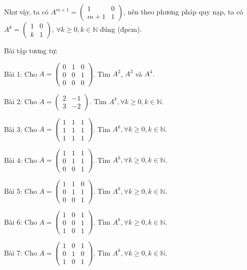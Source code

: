 \documentclass[12pt,a4paper]{article} \usepackage[utf8]{inputenc} \usepackage[T5]{fontenc} \usepackage[vietnamese]{babel} \usepackage{amsmath, amssymb, amsfonts} \usepackage{ulem}
\begin{document}
Như vậy, ta có
$A^{m+1} = \begin{pmatrix} 1 & 0 \\ m+1 & 1 \end{pmatrix}$, nên theo
phương pháp quy nạp, ta có
$A^k = \begin{pmatrix} 1 & 0 \\ k & 1 \end{pmatrix}$,
$\forall k \ge 0, k \in \mathbb{N}$ đúng (đpcm).

Bài tập tương tự:

Bài 1: Cho $A = \begin{pmatrix} 0 & 1 & 0 \\ 0 & 0 & 1 \\ 0 & 0 & 0 \end{pmatrix}$.
Tìm $A^2$, $A^3$ và $A^4$.

Bài 2: Cho $A = \begin{pmatrix} 2 & -1 \\ 3 & -2 \end{pmatrix}$.
Tìm $A^k, \forall k \ge 0, k \in \mathbb{N}$.

Bài 3: Cho $A = \begin{pmatrix} 1 & 1 & 1 \\ 1 & 1 & 1 \\ 1 & 1 & 1 \end{pmatrix}$.
Tìm $A^k, \forall k \ge 0, k \in \mathbb{N}$.

Bài 4: Cho $A = \begin{pmatrix} 1 & 1 & 1 \\ 0 & 1 & 1 \\ 0 & 0 & 1 \end{pmatrix}$.
Tìm $A^k, \forall k \ge 0, k \in \mathbb{N}$.

Bài 5: Cho $A = \begin{pmatrix} 1 & 1 & 0 \\ 0 & 1 & 1 \\ 0 & 0 & 1 \end{pmatrix}$.
Tìm $A^k, \forall k \ge 0, k \in \mathbb{N}$.

Bài 6: Cho $A = \begin{pmatrix} 1 & 0 & 1 \\ 0 & 0 & 1 \\ 1 & 0 & 1 \end{pmatrix}$.
Tìm $A^k, \forall k \ge 0, k \in \mathbb{N}$.

Bài 7: Cho $A = \begin{pmatrix} 1 & 0 & 1 \\ 0 & 1 & 0 \\ 1 & 0 & 1 \end{pmatrix}$.
Tìm $A^k, \forall k \ge 0, k \in \mathbb{N}$.
\end{document}
